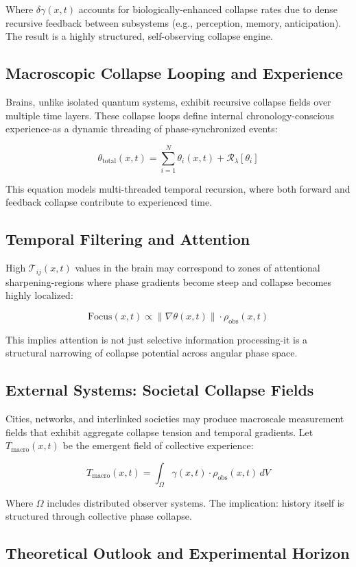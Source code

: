 Where $\delta \gamma(x,t)$ accounts for biologically-enhanced collapse rates due to dense recursive feedback between subsystems (e.g., perception, memory, anticipation). \cite{chapter_time} The result is a highly structured, self-observing collapse engine. \cite{chapter_time} \subsection*{Macroscopic Collapse Looping and Experience}

Brains, unlike isolated quantum systems, exhibit recursive collapse fields over multiple time layers. \cite{chapter_time} These collapse loops define internal chronology-conscious experience-as a dynamic threading of phase-synchronized events:

\[
\theta_{\text{total}}(x,t) = \sum_{i=1}^{N} \theta_i(x,t) + \mathcal{R}_\lambda[\theta_i]
\]

This equation models multi-threaded temporal recursion, where both forward and feedback collapse contribute to experienced time. \cite{chapter_time} \subsection*{Temporal Filtering and Attention}

High $\mathcal{T}_{ij}(x,t)$ values in the brain may correspond to zones of attentional sharpening-regions where phase gradients become steep and collapse becomes highly localized:

\[
\text{Focus}(x,t) \propto \|\nabla \theta(x,t)\| \cdot \rho_{\text{obs}}(x,t)
\]

This implies attention is not just selective information processing-it is a structural narrowing of collapse potential across angular phase space. \cite{chapter_time} \subsection*{External Systems: Societal Collapse Fields}

Cities, networks, and interlinked societies may produce macroscale measurement fields that exhibit aggregate collapse tension and temporal gradients. \cite{chapter_time} Let $T_{\text{macro}}(x,t)$ be the emergent field of collective experience:

\[
T_{\text{macro}}(x,t) = \int_{\Omega} \gamma(x,t) \cdot \rho_{\text{obs}}(x,t) \, dV
\]

Where $\Omega$ includes distributed observer systems. \cite{chapter_time} The implication: history itself is structured through collective phase collapse. \cite{chapter_time} \subsection*{Theoretical Outlook and Experimental Horizon}

